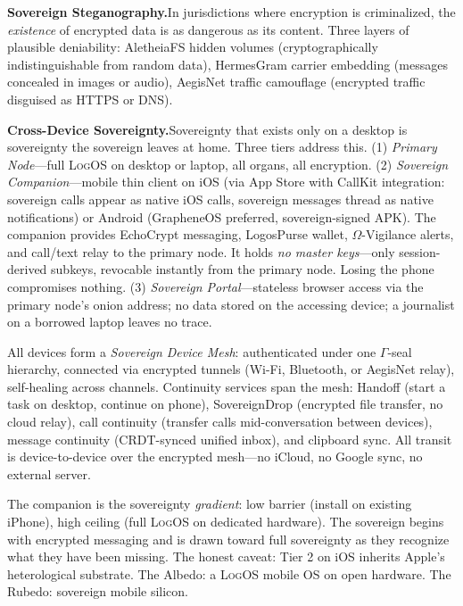 \documentclass[11pt, oneside]{article}
\newcommand{\LogOS}{\textnormal{\textsc{LogOS}}}
\begin{document}
\medskip
\noindent\textbf{Sovereign Steganography.}\quad In jurisdictions where
encryption is criminalized, the \textit{existence} of encrypted data is
as dangerous as its content. Three layers of plausible deniability:
AletheiaFS hidden volumes (cryptographically indistinguishable from
random data), HermesGram carrier embedding (messages concealed in
images or audio), AegisNet traffic camouflage (encrypted traffic
disguised as HTTPS or DNS).

\medskip
\noindent\textbf{Cross-Device Sovereignty.}\quad Sovereignty that exists
only on a desktop is sovereignty the sovereign leaves at home. Three
tiers address this. (1) \textit{Primary Node}---full \LogOS{} on
desktop or laptop, all organs, all encryption. (2) \textit{Sovereign
Companion}---mobile thin client on iOS (via App Store with CallKit
integration: sovereign calls appear as native iOS calls, sovereign
messages thread as native notifications) or Android (GrapheneOS
preferred, sovereign-signed APK). The companion provides EchoCrypt
messaging, LogosPurse wallet, $\Omega$-Vigilance alerts, and
call/text relay to the primary node. It holds \textit{no master
keys}---only session-derived subkeys, revocable instantly from the
primary node. Losing the phone compromises nothing. (3) \textit{Sovereign
Portal}---stateless browser access via the primary node's onion
address; no data stored on the accessing device; a journalist on a
borrowed laptop leaves no trace.

All devices form a \textit{Sovereign Device Mesh}: authenticated under
one $\Gamma$-seal hierarchy, connected via encrypted tunnels (Wi-Fi,
Bluetooth, or AegisNet relay), self-healing across channels. Continuity
services span the mesh: Handoff (start a task on desktop, continue on
phone), SovereignDrop (encrypted file transfer, no cloud relay),
call continuity (transfer calls mid-conversation between devices),
message continuity (CRDT-synced unified inbox), and clipboard sync.
All transit is device-to-device over the encrypted mesh---no iCloud,
no Google sync, no external server.

The companion is the sovereignty \textit{gradient}: low barrier (install
on existing iPhone), high ceiling (full \LogOS{} on dedicated hardware).
The sovereign begins with encrypted messaging and is drawn toward full
sovereignty as they recognize what they have been missing. The honest
caveat: Tier 2 on iOS inherits Apple's heterological substrate. The
Albedo: a \LogOS{} mobile OS on open hardware. The Rubedo: sovereign
mobile silicon.
\end{document}
